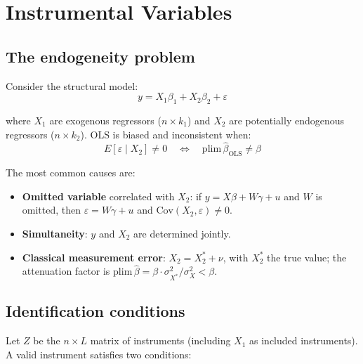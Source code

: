 \chapter{Instrumental Variables}
\label{cap:iv}

\section{The endogeneity problem}

Consider the structural model:
\[
  y = X_1\beta_1 + X_2\beta_2 + \varepsilon
\]

where $X_1$ are exogenous regressors ($n \times k_1$) and $X_2$ are potentially
endogenous regressors ($n \times k_2$). OLS is biased and inconsistent when:
\[
  E[\varepsilon \mid X_2] \neq 0
  \quad\Longleftrightarrow\quad
  \mathrm{plim}\,\hat{\beta}_{\mathrm{OLS}} \neq \beta
\]

The most common causes are:

\begin{itemize}
  \item \textbf{Omitted variable} correlated with $X_2$: if $y = X\beta + W\gamma + u$
        and $W$ is omitted, then $\varepsilon = W\gamma + u$ and $\mathrm{Cov}(X_2, \varepsilon) \neq 0$.
  \item \textbf{Simultaneity}: $y$ and $X_2$ are determined jointly.
  \item \textbf{Classical measurement error}: $X_2 = X_2^* + \nu$, with $X_2^*$
        the true value; the attenuation factor is $\mathrm{plim}\,\hat{\beta} = \beta \cdot \sigma_{X^*}^2/\sigma_X^2 < \beta$.
\end{itemize}

\section{Identification conditions}

Let $Z$ be the $n \times L$ matrix of instruments (including $X_1$ as
included instruments). A valid instrument satisfies two conditions:

